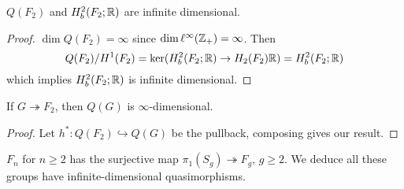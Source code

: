 \begin{theorem}
    $Q(F_2)$ and $H^2_b(F_2; \mathbb{R})$ are infinite dimensional. 
\end{theorem}
\begin{proof}
    $\dim Q(F_2)=\infty$ since $\dim \ell ^{\infty}(\mathbb{Z}_+)=\infty$. Then \[
        Q(F_2)/ H^1(F_2)=\ker (H^2_b(F_2;\mathbb{R}) \to H_2(F_2)\mathbb{R})=H^2_b(F_2;\mathbb{R}) 
    \] which implies $H^2_b(F_2;\mathbb{R})$ is infinite dimensional.
\end{proof}
\begin{cor}
    If $G \twoheadrightarrow F_2$, then $Q(G)$ is $\infty$-dimensional.
\end{cor}
\begin{proof}
    Let $h^* \colon Q(F_2) \hookrightarrow Q(G) $ be the pullback, composing gives our result.
\end{proof}
\begin{example}
    $F_n $ for $n\geq 2$ has the surjective map $\pi_1(S_g) \twoheadrightarrow F_g$, $g \geq 2$. We deduce all these groups have infinite-dimensional quasimorphisms.
\end{example}
